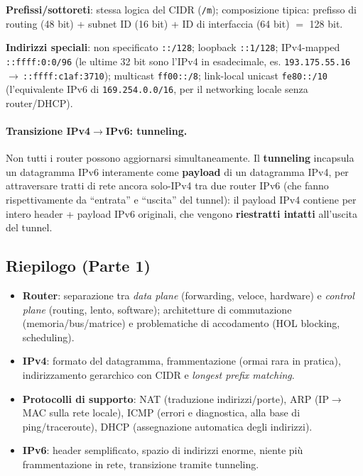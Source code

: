 \documentclass[12pt, a4paper]{article}
\begin{document}
\textbf{Prefissi/sottoreti}: stessa logica del CIDR (\texttt{/m}); composizione tipica: prefisso di routing (48 bit) + subnet ID (16 bit) + ID di interfaccia (64 bit) $=$ 128 bit.

\textbf{Indirizzi speciali}: non specificato \texttt{::/128}; loopback \texttt{::1/128}; IPv4-mapped \texttt{::ffff:0:0/96} (le ultime 32 bit sono l'IPv4 in esadecimale, es. \texttt{193.175.55.16}\,$\to$\,\texttt{::ffff:c1af:3710}); multicast \texttt{ff00::/8}; link-local unicast \texttt{fe80::/10} (l'equivalente IPv6 di \texttt{169.254.0.0/16}, per il networking locale senza router/DHCP).

\paragraph{Transizione IPv4$\to$IPv6: tunneling.} Non tutti i router possono aggiornarsi simultaneamente. Il \textbf{tunneling} incapsula un datagramma IPv6 interamente come \textbf{payload} di un datagramma IPv4, per attraversare tratti di rete ancora solo-IPv4 tra due router IPv6 (che fanno rispettivamente da ``entrata'' e ``uscita'' del tunnel): il payload IPv4 contiene per intero header + payload IPv6 originali, che vengono \textbf{riestratti intatti} all'uscita del tunnel.

\subsection{Riepilogo (Parte 1)}

\begin{itemize}
    \item \textbf{Router}: separazione tra \textit{data plane} (forwarding, veloce, hardware) e \textit{control plane} (routing, lento, software); architetture di commutazione (memoria/bus/matrice) e problematiche di accodamento (HOL blocking, scheduling).
    \item \textbf{IPv4}: formato del datagramma, frammentazione (ormai rara in pratica), indirizzamento gerarchico con CIDR e \textit{longest prefix matching}.
    \item \textbf{Protocolli di supporto}: NAT (traduzione indirizzi/porte), ARP (IP$\to$MAC sulla rete locale), ICMP (errori e diagnostica, alla base di ping/traceroute), DHCP (assegnazione automatica degli indirizzi).
    \item \textbf{IPv6}: header semplificato, spazio di indirizzi enorme, niente più frammentazione in rete, transizione tramite tunneling.
\end{itemize}
\end{document}
